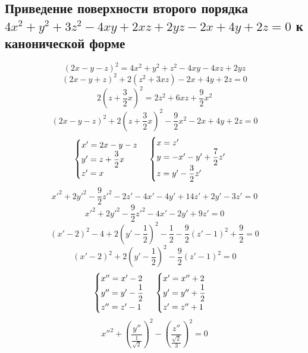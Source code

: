 \documentclass[12pt]{article}
\begin{document}
\subsection{Приведение поверхности второго порядка $4x^2 + y^2 + 3z^2 - 4xy + 2xz + 2yz - 2x + 4y + 2z = 0$ к канонической форме}
\[
    (2x - y - z)^2 = 4x^2 + y^2 + z^2 - 4xy - 4xz + 2yz
\]
\[
    (2x - y + z)^2 + 2(z^2 + 3xz) - 2x + 4y + 2z = 0
\]
\[
    2(z + \dfrac{3}{2}x)^2 = 2z^2 + 6xz + \dfrac{9}{2}x^2
\]
\[
    (2x - y - z)^2 + 2(z + \dfrac{3}{2}x)^2 - \dfrac{9}{2}x^2 - 2x + 4y + 2z = 0
\]
\[
    \begin{cases}
        x' = 2x - y - z        \\
        y' = z + \dfrac{3}{2}x \\
        z' = x
    \end{cases}
    \\
    \begin{cases}
        x = z'                        \\
        y = -x' - y' + \dfrac{7}{2}z' \\
        z = y' - \dfrac{3}{2}z'
    \end{cases}
\]
\[
    {x'}^2 + 2{y'}^2 - \dfrac{9}{2}{z'}^2 - 2z' - 4x' - 4y' + 14z' + 2y' - 3z' = 0
\]
\[
    {x'}^2 + 2{y'}^2 - \dfrac{9}{2}{z'}^2 - 4x' - 2y' + 9z' = 0
\]
\[
    (x' - 2)^2 - 4 + 2\left(y' - \dfrac{1}{2}\right)^2 - \dfrac{1}{2} - \dfrac{9}{2}\left(z' - 1\right)^2 + \dfrac{9}{2} = 0
\]
\[
    (x' - 2)^2 + 2\left(y' - \dfrac{1}{2}\right)^2 - \dfrac{9}{2}\left(z' - 1\right)^2 = 0
\]
\[
    \begin{cases}
        x'' = x' - 2            \\
        y'' = y' - \dfrac{1}{2} \\
        z'' = z' - 1
    \end{cases}
    \\
    \begin{cases}
        x' = x'' + 2            \\
        y' = y'' + \dfrac{1}{2} \\
        z' = z'' + 1
    \end{cases}
\]
\[
    {x''}^2 + \left(\dfrac{y''}{\frac{1}{\sqrt{2}}}\right)^2 - \left(\dfrac{z''}{\frac{\sqrt{2}}{3}}\right)^2 = 0
\]
\end{document}

